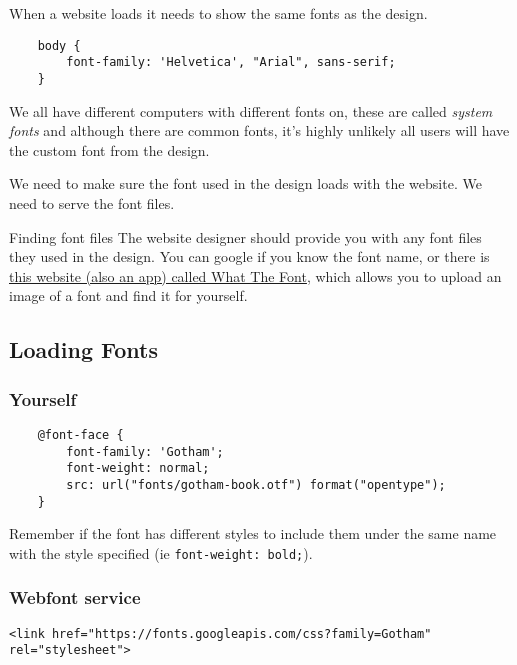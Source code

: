 When a website loads it needs to show the same fonts as the design.

\begin{verbatim}
    body {
        font-family: 'Helvetica', "Arial", sans-serif;
    }
\end{verbatim}

We all have different computers with different fonts on, these are called \textit{system fonts} and although there are common fonts, it's highly unlikely all users will have the custom font from the design.

We need to make sure the font used in the design loads with the website. We need to serve the font files.

\begin{infobox}{Finding font files}
    The website designer should provide you with any font files they used in the design. You can google if you know the font name, or there is \href{https://www.myfonts.com/WhatTheFont}{this website (also an app) called What The Font}, which allows you to upload an image of a font and find it for yourself.
\end{infobox}

\subsection{Loading Fonts}

\subsubsection{Yourself}

\begin{verbatim}
    @font-face {
        font-family: 'Gotham';
        font-weight: normal;
        src: url("fonts/gotham-book.otf") format("opentype");
    }
\end{verbatim}

Remember if the font has different styles to include them under the same name with the style specified (ie \texttt{font-weight: bold;}).

\subsubsection{Webfont service}

\begin{verbatim}
<link href="https://fonts.googleapis.com/css?family=Gotham" rel="stylesheet">
\end{verbatim}

